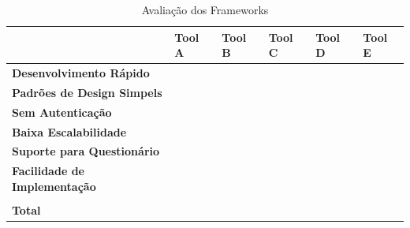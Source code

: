 \begin{table}[]
    \centering
    \begin{tabular}{@{}llllll@{}}
        \toprule
        \textbf{}                                                  & \textbf{Tool A}       & \textbf{Tool B}       & \textbf{Tool C}       & \textbf{Tool D}       & \textbf{Tool E}       \\ \midrule
        \multicolumn{1}{|l|}{\textbf{Desenvolvimento Rápido}}      & \multicolumn{1}{l|}{} & \multicolumn{1}{l|}{} & \multicolumn{1}{l|}{} & \multicolumn{1}{l|}{} & \multicolumn{1}{l|}{} \\ \midrule
        \multicolumn{1}{|l|}{\textbf{Padrões de Design Simpels}}   & \multicolumn{1}{l|}{} & \multicolumn{1}{l|}{} & \multicolumn{1}{l|}{} & \multicolumn{1}{l|}{} & \multicolumn{1}{l|}{} \\ \midrule
        \multicolumn{1}{|l|}{\textbf{Sem Autenticação}}            & \multicolumn{1}{l|}{} & \multicolumn{1}{l|}{} & \multicolumn{1}{l|}{} & \multicolumn{1}{l|}{} & \multicolumn{1}{l|}{} \\ \midrule
        \multicolumn{1}{|l|}{\textbf{Baixa Escalabilidade}}        & \multicolumn{1}{l|}{} & \multicolumn{1}{l|}{} & \multicolumn{1}{l|}{} & \multicolumn{1}{l|}{} & \multicolumn{1}{l|}{} \\ \midrule
        \multicolumn{1}{|l|}{\textbf{Suporte para Questionário}}   & \multicolumn{1}{l|}{} & \multicolumn{1}{l|}{} & \multicolumn{1}{l|}{} & \multicolumn{1}{l|}{} & \multicolumn{1}{l|}{} \\ \midrule
        \multicolumn{1}{|l|}{\textbf{Facilidade de Implementação}} & \multicolumn{1}{l|}{} & \multicolumn{1}{l|}{} & \multicolumn{1}{l|}{} & \multicolumn{1}{l|}{} & \multicolumn{1}{l|}{} \\ \midrule
                                                                   &                       &                       &                       &                       &                       \\ \midrule
                                                                   \multicolumn{1}{|l|}{\textbf{Total}}                       & \multicolumn{1}{l|}{} & \multicolumn{1}{l|}{} & \multicolumn{1}{l|}{} & \multicolumn{1}{l|}{} & \multicolumn{1}{l|}{} \\ \bottomrule
    \end{tabular}
    \caption{Avaliação dos Frameworks}
    \label{my-label}
\end{table}

